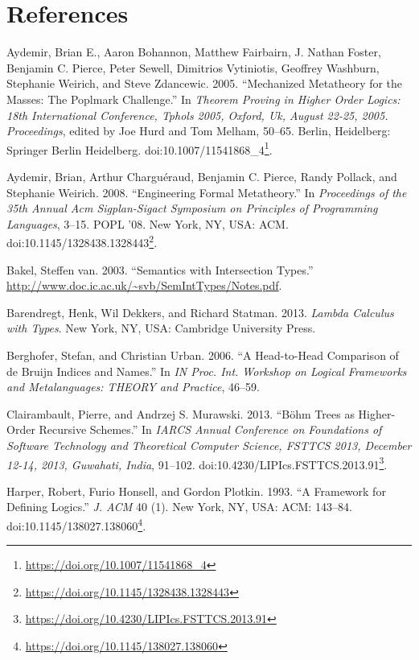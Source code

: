 \documentclass[a4paper, 12pt, twoside]{style/ociamthesis}
\theoremstyle{plain}
\theoremstyle{definition}
\theoremstyle{remark}
\renewcommand{\href}[2]{#2\footnote{\url{#1}}}
\begin{document}
\footnotesize

\chapter*{References}\label{references}

\hypertarget{refs}{}
\hypertarget{ref-aydemir05}{}
Aydemir, Brian E., Aaron Bohannon, Matthew Fairbairn, J. Nathan Foster,
Benjamin C. Pierce, Peter Sewell, Dimitrios Vytiniotis, Geoffrey
Washburn, Stephanie Weirich, and Steve Zdancewic. 2005. ``Mechanized
Metatheory for the Masses: The Poplmark Challenge.'' In \emph{Theorem
Proving in Higher Order Logics: 18th International Conference, Tphols
2005, Oxford, Uk, August 22-25, 2005. Proceedings}, edited by Joe Hurd
and Tom Melham, 50--65. Berlin, Heidelberg: Springer Berlin Heidelberg.
doi:\href{https://doi.org/10.1007/11541868_4}{10.1007/11541868\_4}.

\hypertarget{ref-aydemir08}{}
Aydemir, Brian, Arthur Charguéraud, Benjamin C. Pierce, Randy Pollack,
and Stephanie Weirich. 2008. ``Engineering Formal Metatheory.'' In
\emph{Proceedings of the 35th Annual Acm Sigplan-Sigact Symposium on
Principles of Programming Languages}, 3--15. POPL '08. New York, NY,
USA: ACM.
doi:\href{https://doi.org/10.1145/1328438.1328443}{10.1145/1328438.1328443}.

\hypertarget{ref-bakel}{}
Bakel, Steffen van. 2003. ``Semantics with Intersection Types.''
\url{http://www.doc.ic.ac.uk/~svb/SemIntTypes/Notes.pdf}.

\hypertarget{ref-barendregt13}{}
Barendregt, Henk, Wil Dekkers, and Richard Statman. 2013. \emph{Lambda
Calculus with Types}. New York, NY, USA: Cambridge University Press.

\hypertarget{ref-berghofer06}{}
Berghofer, Stefan, and Christian Urban. 2006. ``A Head-to-Head
Comparison of de Bruijn Indices and Names.'' In \emph{IN Proc. Int.
Workshop on Logical Frameworks and Metalanguages: THEORY and Practice},
46--59.

\hypertarget{ref-clairambault13}{}
Clairambault, Pierre, and Andrzej S. Murawski. 2013. ``Böhm Trees as
Higher-Order Recursive Schemes.'' In \emph{IARCS Annual Conference on
Foundations of Software Technology and Theoretical Computer Science,
FSTTCS 2013, December 12-14, 2013, Guwahati, India}, 91--102.
doi:\href{https://doi.org/10.4230/LIPIcs.FSTTCS.2013.91}{10.4230/LIPIcs.FSTTCS.2013.91}.

\hypertarget{ref-harper93}{}
Harper, Robert, Furio Honsell, and Gordon Plotkin. 1993. ``A Framework
for Defining Logics.'' \emph{J. ACM} 40 (1). New York, NY, USA: ACM:
143--84.
doi:\href{https://doi.org/10.1145/138027.138060}{10.1145/138027.138060}.
\end{document}
